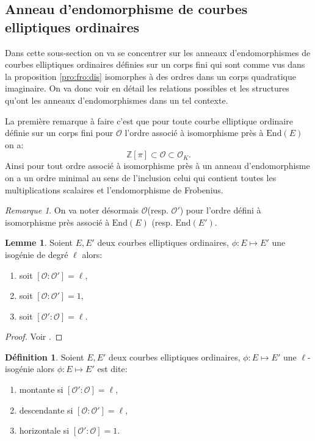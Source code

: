 \documentclass[10pt,a4paper]{book}
\theoremstyle{plain}
\theoremstyle{definition}
\newtheorem{lem}[thm]{Lemme}
\theoremstyle{definition}
\theoremstyle{definition}
\theoremstyle{definition}
\newtheorem{defi}[thm]{Définition}
\theoremstyle{remark}
\newtheorem{rem}[thm]{Remarque}
\theoremstyle{remark}
\begin{document}
\subsection{Anneau d'endomorphisme de courbes elliptiques ordinaires}
Dans cette sous-section on va se concentrer sur les anneaux d'endomorphismes de courbes elliptiques ordinaires définies sur un corps fini qui sont comme vus dans la proposition \ref{pro:fro:dis} isomorphes à des ordres dans un corps quadratique imaginaire. On va donc voir en détail les relations possibles et les structures qu'ont les anneaux d'endomorphismes dans un tel contexte.

La première remarque à faire c'est que pour toute courbe elliptique ordinaire définie sur un corps fini pour $\mathcal{O}$ l'ordre associé à isomorphisme près à $\mathrm{End}(E)$ on a: 
\[
\mathbb{Z}[\pi] \subset \mathcal{O} \subset \mathcal{O}_K.
\]
Ainsi pour tout ordre associé à isomorphisme près à un anneau d'endomorphisme on a un ordre minimal au sens de l'inclusion celui qui contient toutes les multiplications scalaires et l'endomorphisme de Frobenius.

\begin{rem}
On va noter désormais $\mathcal{O}$(resp. $\mathcal{O}'$) pour l'ordre défini à isomorphisme près associé à $\mathrm{End}(E)$ (resp. $\mathrm{End}(E')$.
\end{rem}

\begin{lem}
Soient $E,E'$ deux courbes elliptiques ordinaires, $\phi: E \mapsto E'$ une isogénie de degré $\ell$ alors:
\begin{enumerate}
\item soit $[\mathcal{O} : \mathcal{O'}]=\ell$, 
\item soit $[\mathcal{O} : \mathcal{O'}]=1$,
\item soit $[\mathcal{O'} : \mathcal{O}]=\ell$.
\end{enumerate}
\end{lem}

\begin{proof}
Voir \cite[Proposition 21]{Kohel96}.
\end{proof}

\begin{defi}
Soient $E,E'$ deux courbes elliptiques ordinaires, $\phi: E \mapsto E'$ une $\ell$-isogénie alors $\phi: E \mapsto E'$ est dite:
\begin{enumerate}
\item montante si $[\mathcal{O'} : \mathcal{O}]=\ell$,
\item descendante si $[\mathcal{O} : \mathcal{O'}]=\ell$,
\item horizontale si $[\mathcal{O'} : \mathcal{O}]=1$.
\end{enumerate}
\end{defi}
\end{document}
